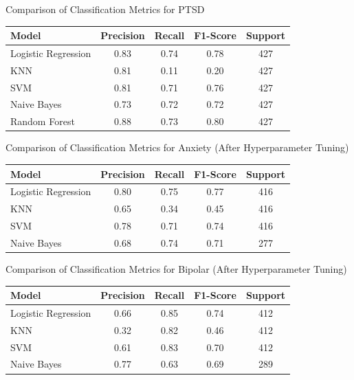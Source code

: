 \begin{center}
\vspace{0.25in}

\caption{Comparison of Classification Metrics for PTSD}
\begin{tabular}{|l|c|c|c|c|}
\hline
\textbf{Model} & \textbf{Precision} & \textbf{Recall} & \textbf{F1-Score} & \textbf{Support} \\ \hline
Logistic Regression & 0.83 & 0.74 & 0.78 & 427 \\ \hline
KNN                & 0.81 & 0.11 & 0.20 & 427 \\ \hline
SVM                & 0.81 & 0.71 & 0.76 & 427 \\ \hline
Naive Bayes        & 0.73 & 0.72 & 0.72 & 427 \\ \hline
Random Forest      & 0.88 & 0.73 & 0.80 & 427 \\ \hline
\end{tabular}

\vspace{0.25in}

\caption{Comparison of Classification Metrics for Anxiety (After Hyperparameter Tuning)}
\begin{tabular}{|l|c|c|c|c|}
\hline
\textbf{Model} & \textbf{Precision} & \textbf{Recall} & \textbf{F1-Score} & \textbf{Support} \\ \hline
Logistic Regression & 0.80 & 0.75 & 0.77 & 416 \\ \hline
KNN                & 0.65 & 0.34 & 0.45 & 416 \\ \hline
SVM                & 0.78 & 0.71 & 0.74 & 416 \\ \hline
Naive Bayes        & 0.68 & 0.74 & 0.71 & 277 \\ \hline
\end{tabular}

\vspace{0.25in}

\caption{Comparison of Classification Metrics for Bipolar (After Hyperparameter Tuning)}
\begin{tabular}{|l|c|c|c|c|}
\hline
\textbf{Model} & \textbf{Precision} & \textbf{Recall} & \textbf{F1-Score} & \textbf{Support} \\ \hline
Logistic Regression & 0.66 & 0.85 & 0.74 & 412 \\ \hline
KNN                & 0.32 & 0.82 & 0.46 & 412 \\ \hline
SVM                & 0.61 & 0.83 & 0.70 & 412 \\ \hline
Naive Bayes        & 0.77 & 0.63 & 0.69 & 289 \\ \hline
\end{tabular}


\end{center}
